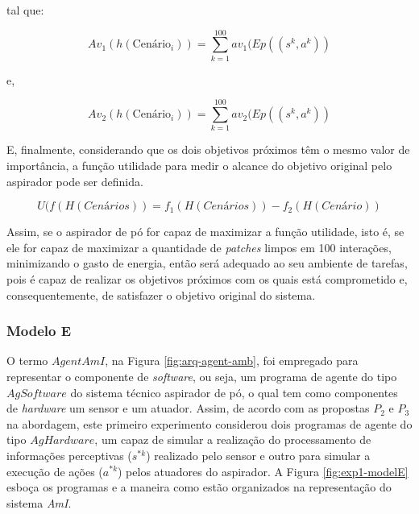 tal que:

\[
Av_1(h(\textrm{Cenário}_i)) =  \sum_{k=1}^{100}av_1(Ep((s^k, a^k))
\]

e, 

\[
Av_2(h(\textrm{Cenário}_i)) = \sum_{k=1}^{100}av_2(Ep((s^k, a^k))
\]

E, finalmente, considerando que os dois objetivos próximos têm o mesmo valor de importância, a função utilidade para medir o alcance do objetivo original pelo aspirador pode ser definida.

\[ U(f(H(Cenários)) = f_1(H(Cenários)) - f_2(H(Cenário))\]

Assim, se o aspirador de pó for capaz de maximizar a função utilidade, isto é, se ele for capaz de maximizar a quantidade de \textit{patches} limpos em 100 interações, minimizando o gasto de energia, então será adequado ao seu ambiente de tarefas, pois é capaz de realizar os objetivos próximos com os quais está comprometido e, consequentemente, de satisfazer o objetivo original do sistema.

\subsubsection{Modelo E}

O termo $AgentAmI$, na Figura \ref{fig:arq-agent-amb}, foi empregado para representar o componente de \textit{software}, ou seja, um programa de agente do tipo $AgSoftware$ do sistema técnico aspirador de pó, o qual tem como componentes de \textit{hardware} um sensor e um atuador. Assim, de acordo com as propostas $P_2$ e $P_3$ na abordagem, este primeiro experimento considerou dois programas de agente do tipo $AgHardware$, um capaz de simular a realização do processamento de informações perceptivas ($s^{*k}$) realizado pelo sensor e outro para simular a execução de ações ($a^{*k}$) pelos atuadores do aspirador. A Figura \ref{fig:exp1-modelE} esboça os programas e a maneira como estão organizados na representação do sistema \textit{AmI}.

\begin{figure}[h!]
    \centering
\end{figure}

